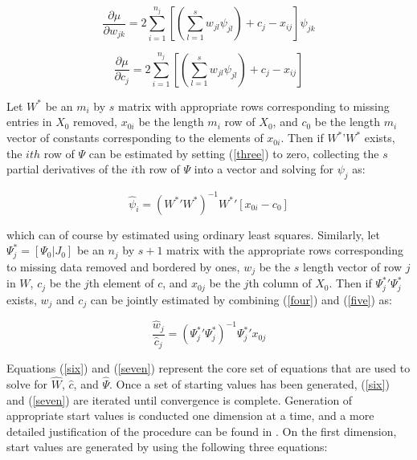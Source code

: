 \documentclass[nojss]{jss}
\begin{document}
\begin{equation}
\frac{\partial \mu}{\partial w_{jk}} = 2\displaystyle\sum\limits_{i=1}^{n_j} [(\sum\limits_{l=1}^s w_{jl}\psi_{jl})+ c_j - x_{ij}]\psi_{jk}
\label{four}
\end{equation}

\begin{equation}
\frac{\partial \mu}{\partial c_j} = 2\displaystyle\sum\limits_{i=1}^{n_j} [(\sum\limits_{l=1}^s w_{jl}\psi_{jl})+ c_j - x_{ij}]
\label{five}
\end{equation}

Let $W^*$ be an $m_i$ by $s$ matrix with appropriate rows corresponding to missing entries in $X_0$ removed, $x_{0i}$ be the
length $m_i$ row of $X_0$, and $c_0$ be the length $m_i$ vector of constants corresponding to the elements of $x_{0i}$. Then
if $W^*$'$W^*$ exists, the $ith$ row of $\Psi$ can be estimated by setting (\ref{three}) to zero, collecting the $s$ partial derivatives
of the $i$th row of $\Psi$ into a vector and solving for $\psi_j$ as:

\begin{equation}
\hat{\psi}_i = (W^*\mathrm{'}W^*)^{-1} W^*\mathrm{'}[x_{0i} - c_{0}]
\label{six}
\end{equation}

\noindent which can of course by estimated using ordinary least squares. Similarly, let $\Psi_j^* = [\Psi_0|J_0]$ be an
$n_j$ by $s+1$ matrix with the appropriate rows corresponding to missing data removed and bordered by ones, $w_j$ be
the $s$ length vector of row $j$ in $W$, $c_j$ be the $j$th element of $c$, and $x_{0j}$ be the $j$th column of $X_0$.
Then if $\Psi_{j}^*$$'\Psi_j^*$ exists, $w_j$ and $c_j$ can be jointly estimated by combining (\ref{four}) and (\ref{five}) as:

\begin{equation}
\frac{\hat{w}_j}{\hat{c}_j} = (\Psi_j^*\mathrm{'}\Psi_j^*)^{-1} \Psi_j^*\mathrm{'}x_{0j}
\label{seven}
\end{equation}

Equations (\ref{six}) and (\ref{seven}) represent the core set of equations that are used to solve for $\hat{W}$,
$\hat{c}$, and $\hat{\Psi}$. Once a set of starting values has been generated, (\ref{six}) and (\ref{seven}) are
iterated until convergence is complete. Generation of appropriate start values is conducted one dimension at a time,
and a more detailed justification of the procedure can be found in \citet{poole1998recovering}. On the first dimension, start
values are generated by using the following three equations:
\end{document}
